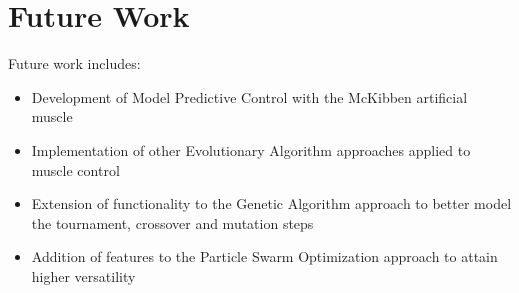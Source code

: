 \section{Future Work}

Future work includes:

\begin{itemize}[noitemsep]
	\item Development of Model Predictive Control with the McKibben artificial muscle
	\item Implementation of other Evolutionary Algorithm approaches applied to muscle control
	\item Extension of functionality to the Genetic Algorithm approach to better model the tournament, crossover and mutation steps
	\item Addition of features to the Particle Swarm Optimization approach to attain higher versatility
\end{itemize}
